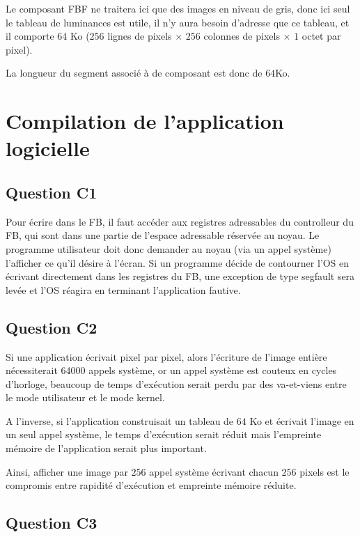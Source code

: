 \documentclass{article}
\begin{document}
Le composant FBF ne traitera ici que des images en niveau de gris, donc ici seul le tableau de luminances est utile, il n'y aura besoin d'adresse que ce tableau, et il comporte $64$ Ko ($256$ lignes de pixels $\times$ $256$ colonnes de pixels $\times$ $1$ octet par pixel).

La longueur du segment associé à de composant est donc de $64$Ko.

\section{Compilation de l'application logicielle}

\subsection{Question C1}

Pour écrire dans le FB, il faut accéder aux registres adressables du controlleur du FB, qui sont dans une partie de l'espace adressable réservée au noyau. Le programme utilisateur doit donc demander au noyau (via un appel système) l'afficher ce qu'il désire à l'écran. Si un programme décide de contourner l'OS en écrivant directement dans les registres du FB, une exception de type segfault sera levée et l'OS réagira en terminant l'application fautive.

\subsection{Question C2}

Si une application écrivait pixel par pixel, alors l'écriture de l'image entière nécessiterait 64000 appels système, or un appel système est couteux en cycles d'horloge, beaucoup de temps d'exécution serait perdu par des va-et-viens entre le mode utilisateur et le mode kernel.

A l'inverse, si l'application construisait un tableau de $64$ Ko et écrivait l'image en un seul appel système, le temps d'exécution serait réduit mais l'empreinte mémoire de l'application serait plus important.

Ainsi, afficher une image par $256$ appel système écrivant chacun $256$ pixels est le compromis entre rapidité d'exécution et empreinte mémoire réduite.

\subsection{Question C3}
\end{document}
